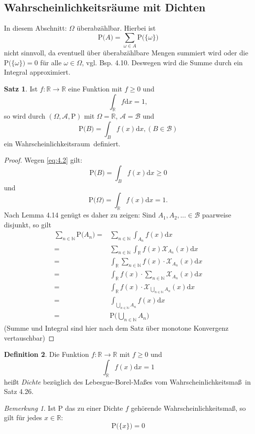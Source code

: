 \documentclass[a4paper,12pt,fleqn]{scrartcl}
\newcommand{\N}{\mathbb{N}}
\newcommand{\R}{\mathbb{R}}
\newcommand{\m}[1]{\mathcal{ #1 }}
\newcommand{\prob}[1]{\text{P(} #1 \text{)}}
\newcommand{\WR}{Wahrscheinlichkeitsraum}
\newcommand{\WM}{Wahrscheinlichkeitsmaß}
\theoremstyle{definition}
\newtheorem{definition}{Definition}[section]
\newtheorem{satz}[definition]{Satz}
\theoremstyle{plain}
\theoremstyle{remark}
\newtheorem*{bemerkung}{Bemerkung}
\begin{document}
\subsection{Wahrscheinlichkeitsräume mit Dichten}
In diesem Abschnitt: $\Omega$ überabzählbar.
Hierbei ist
\[\prob{A}=\sum_{\omega\in A}\prob{\{\omega\}}\]
nicht sinnvoll, da eventuell über überabzählbare Mengen summiert wird oder die $\prob{\{\omega\}}=0$ für alle $\omega\in\Omega$, vgl. Bsp. 4.10. Deswegen wird die Summe durch ein Integral approximiert.
\begin{satz}
Ist $f:\R\to\R$ eine Funktion mit $f\geq 0$ und 
\begin{equation*}\label{eq:4.2}
\int_{\R}f\mathrm{d}x=1,
\end{equation*}
so wird durch $(\Omega,\m{A},\text{P})$ mit $\Omega=\R$, $\m{A}=\m{B}$ und
\begin{equation*}\label{eq:4.3}
\prob{B}=\int_{B}f(x)\mathrm{d}x,(B\in\m{B})
\end{equation*}
ein \WR \, definiert.
\end{satz}
\begin{proof}
Wegen \eqref{eq:4.2} gilt:
\[\prob{B}=\int_Bf(x)\mathrm{d}x\geq 0\]
und
\[\prob{\Omega}=\int_{\R}f(x)\mathrm{d}x=1.\]
Nach Lemma 4.14 genügt es daher zu zeigen: Sind $A_1,A_2,...\in \m{B}$ paarweise disjunkt, so gilt
\begin{align*}
\sum_{n\in\N}\prob{A_n}=&\sum_{n\in\N}\int_{A_n}f(x)\mathrm{d}x\\
=&\sum_{n\in\N}\int_{\R}f(x)\m{X}_{A_n}(x)\mathrm{d}x\\
=&\int_{\R}\sum_{n\in\N}f(x)\cdot\m{X}_{A_n}(x)\mathrm{d}x\\
=&\int_{\R}f(x)\cdot\sum_{n\in\N}\m{X}_{A_n}(x)\mathrm{d}x\\
=&\int_{\R}f(x)\cdot\m{X}_{\bigcup_{n\in\N}A_n}(x)\mathrm{d}x\\
=&\int_{\bigcup_{n\in\N}A_n}f(x)\mathrm{d}x\\
=&\prob{\bigcup_{n\in\N}A_n}
\end{align*}
(Summe und Integral sind hier nach dem Satz über monotone Konvergenz vertauschbar)
\end{proof}
\begin{definition}
Die Funktion $f:\R\to\R$ mit $f\geq 0$ und
\[\int_{\R}f(x)\mathrm{d}x=1\]
heißt \emph{Dichte} bezüglich des Lebesgue-Borel-Maßes vom \WM \, in Satz 4.26.
\end{definition}
\begin{bemerkung}
Ist P das zu einer Dichte $f$ gehörende \WM, so gilt für jedes $x\in\R$:
\[\prob{\{ x\}}=0\]
\end{bemerkung}
\end{document}
